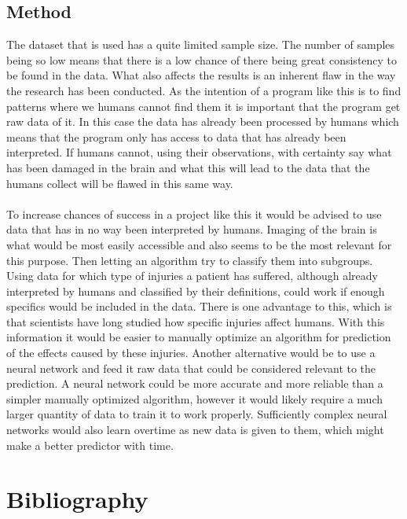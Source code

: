 \documentclass[11pt]{article}
\begin{document}
\subsection{Method}
The dataset that is used has a quite limited sample size. The number of samples being so low means that there is a low chance of there being great consistency to be found in the data. What also affects the results is an inherent flaw in the way the research has been conducted. As the intention of a program like this is to find patterns where we humans cannot find them it is important that the program get raw data of it. In this case the data has already been processed by humans which means that the program only has access to data that has already been interpreted. If humans cannot, using their observations, with certainty say what has been damaged in the brain and what this will lead to the data that the humans collect will be flawed in this same way.\\
\\
To increase chances of success in a project like this it would be advised to use data that has in no way been interpreted by humans. Imaging of the brain is what would be most easily accessible and also seems to be the most relevant for this purpose. Then letting an  algorithm try to classify them into subgroups. Using data for which type of injuries a patient has suffered, although already interpreted by humans and classified by their definitions, could work if enough specifics would be included in the data. There is one advantage to this, which is that scientists have long studied how specific injuries affect humans. With this information it would be easier to manually optimize an algorithm for prediction of the effects caused by these injuries. Another alternative would be to use a neural network and feed it raw data that could be considered relevant to the prediction. A neural network could be more accurate and more reliable than a simpler manually optimized algorithm, however it would likely require a much larger quantity of data to train it to work properly. Sufficiently complex neural networks would also learn overtime as new data is given to them, which might make a better predictor with time.
\clearpage

\printglossary
\printglossary[type=\acronymtype]

\section{Bibliography}

\printbibliography
\end{document}
